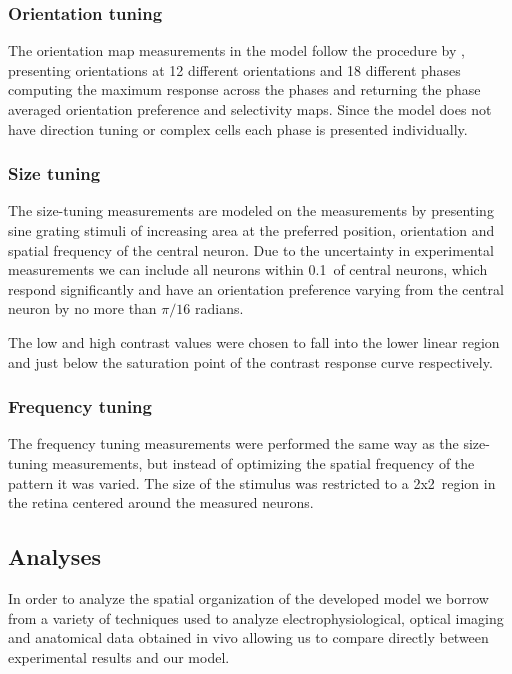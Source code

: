 \subsubsection{Orientation tuning} \label{ORMeasurement}

The orientation map measurements in the model follow the procedure by
\cite{Blasdel1992}, presenting orientations at 12 different
orientations and 18 different phases computing the maximum response
across the phases and returning the phase averaged orientation
preference and selectivity maps. Since the model does not have
direction tuning or complex cells each phase is presented
individually.

\subsubsection{Size tuning}

The size-tuning measurements are modeled on the measurements by
\cite{Sceniak1999, Sceniak2001} presenting sine grating stimuli of
increasing area at the preferred position, orientation and spatial
frequency of the central neuron. Due to the uncertainty in
experimental measurements we can include all neurons within 
0.1\degree\ of central neurons, which respond significantly and have an
orientation preference varying from the central neuron by no more than
$\pi/16$ radians.

The low and high contrast values were chosen to fall into the lower
linear region and just below the saturation point of the contrast
response curve respectively.

\subsubsection{Frequency tuning}

The frequency tuning measurements were performed the same way as the
size-tuning measurements, but instead of optimizing the spatial
frequency of the pattern it was varied. The size of the stimulus was
restricted to a 2x2\degree\ region in the retina centered around the
measured neurons.

\subsection{Analyses}

In order to analyze the spatial organization of the developed model we
borrow from a variety of techniques used to analyze
electrophysiological, optical imaging and anatomical data obtained in
vivo allowing us to compare directly between experimental results and
our model.


